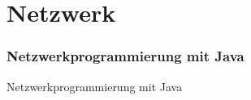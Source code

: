 \section{Netzwerk}
\begin{frame}
\frametitle{Netzwerkprogrammierung mit Java}
	\huge Netzwerkprogrammierung mit Java
\end{frame}